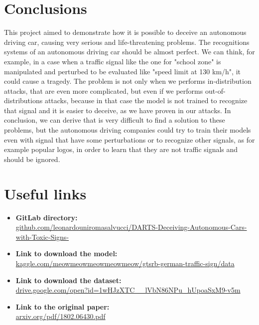 \section{Conclusions}
This project aimed to demonstrate how it is possible to deceive an autonomous driving car, causing very serious and life-threatening problems. 
The recognitions systems of an autonomous driving car should be almost perfect. We can think, for example, in a case when a traffic signal like the one for "school zone" is manipulated and perturbed to be evaluated like "speed limit at 130 km/h", it could cause a tragedy.
\newline
The problem is not only when we performs in-distribution attacks, that are even more complicated, but even if we performs out-of-distributions attacks, because in that case the model is not trained to recognize that signal and it is easier to deceive, as we have proven in our attacks.
\newline
In conclusion, we can derive that is very difficult to find a solution to these problems, but the autonomous driving companies could try to train their models even with signal that have some perturbations or to recognize other signals, as for example popular logos, in order to learn that they are not traffic signals and should be ignored.

\section*{Useful links}
\begin{itemize}
\item \textbf{GitLab directory:}\\
\url{github.com/leonardouniromasalvucci/DARTS-Deceiving-Autonomous-Cars-with-Toxic-Signs-}\\

\item \textbf{Link to download the model:}\\
\url{kaggle.com/meowmeowmeowmeowmeow/gtsrb-german-traffic-sign/data}\\

\item \textbf{Link to download the dataset:}\\
\url{drive.google.com/open?id=1wHJzXTC__lVbN86NPu_hUpoaSxM9-v5m}\\

\item \textbf{Link to the original paper:}\\
\url{arxiv.org/pdf/1802.06430.pdf}\\
\end{itemize}

